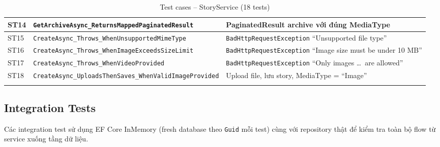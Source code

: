 \documentclass[a4paper]{article}
\begin{document}
\begin{longtable}{|C{0.8cm}|L{5.4cm}|L{7.4cm}|}
\hline
ST14 & \texttt{GetArchiveAsync\_ReturnsMappedPaginatedResult} & PaginatedResult archive với đúng MediaType \\
\hline
{}
ST15 & \texttt{CreateAsync\_Throws\_WhenUnsupportedMimeType} & \texttt{BadHttpRequestException} ``Unsupported file type'' \\
\hline
ST16 & \texttt{CreateAsync\_Throws\_WhenImageExceedsSizeLimit} & \texttt{BadHttpRequestException} ``Image size must be under 10 MB'' \\
\hline
{}
ST17 & \texttt{CreateAsync\_Throws\_WhenVideoProvided} & \texttt{BadHttpRequestException} ``Only images \ldots\ are allowed'' \\
\hline
ST18 & \texttt{CreateAsync\_UploadsThenSaves\_WhenValidImageProvided} & Upload file, lưu story, MediaType = ``Image'' \\
\hline
\caption{Test cases -- StoryService (18 tests)}
\end{longtable}

\subsection{Integration Tests}

Các integration test sử dụng EF Core InMemory (fresh database theo \texttt{Guid} mỗi test) cùng với
repository thật để kiểm tra toàn bộ flow từ service xuống tầng dữ liệu.
\end{document}
